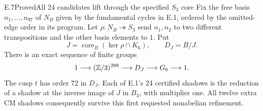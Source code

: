 \begin{statement}{E.7}{Proved}{All 24 candidates lift through the specified $S_3$ core}
Fix the free basis $n_1,\ldots,n_{97}$ of $N_B$ given by the
fundamental cycles in E.1, ordered by the omitted-edge order in its
program. Let $\rho:N_B\twoheadrightarrow S_3$ send $n_1,n_2$ to
two different transpositions and the other basis elements to $1$.
Put
\[
 J=\operatorname{core}_B(\ker\rho\cap K_6),
 \qquad D_J=B/J.
\]
There is an exact sequence of finite groups
\[
 1\longrightarrow (\mathbb Z/3)^{288}\longrightarrow D_J
       \longrightarrow G_6\longrightarrow1.
\]
The cusp $t$ has order $72$ in $D_J$. Each of E.1's 24 certified
shadows is the reduction of a shadow at the inverse image of $J$ in
$B_3$, with multiplier one. All twelve extra CM shadows consequently
survive this first requested nonabelian refinement.
\end{statement}

